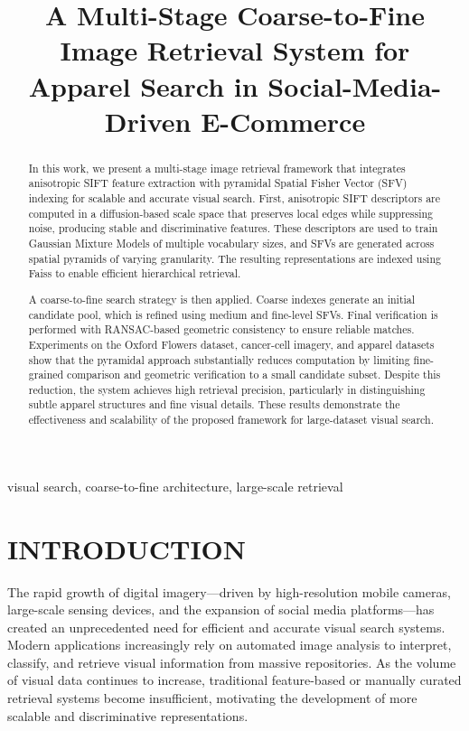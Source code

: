 \documentclass[conference]{IEEEtran}
\title{A Multi-Stage Coarse-to-Fine Image Retrieval System for Apparel Search in Social-Media-Driven E-Commerce}
\author{\IEEEauthorblockN{Patrick Fuentes Carpio}
\IEEEauthorblockA{\textit{Department of Computer Science} \\
\textit{University of Example}\\
City, Country \\
email@example.com}
}
\begin{document}
\maketitle

\begin{abstract}
In this work, we present a multi-stage image retrieval framework that integrates anisotropic SIFT feature extraction with pyramidal Spatial Fisher Vector (SFV) indexing for scalable and accurate visual search. First, anisotropic SIFT descriptors are computed in a diffusion-based scale space that preserves local edges while suppressing noise, producing stable and discriminative features. These descriptors are used to train Gaussian Mixture Models of multiple vocabulary sizes, and SFVs are generated across spatial pyramids of varying granularity. The resulting representations are indexed using Faiss to enable efficient hierarchical retrieval.

A coarse-to-fine search strategy is then applied. Coarse indexes generate an initial candidate pool, which is refined using medium and fine-level SFVs. Final verification is performed with RANSAC-based geometric consistency to ensure reliable matches. Experiments on the Oxford Flowers dataset, cancer-cell imagery, and apparel datasets show that the pyramidal approach substantially reduces computation by limiting fine-grained comparison and geometric verification to a small candidate subset. Despite this reduction, the system achieves high retrieval precision, particularly in distinguishing subtle apparel structures and fine visual details. These results demonstrate the effectiveness and scalability of the proposed framework for large-dataset visual search.
\end{abstract}

\begin{IEEEkeywords}
visual search, coarse-to-fine architecture, large-scale retrieval
\end{IEEEkeywords}


\section{INTRODUCTION}
The rapid growth of digital imagery—driven by high-resolution mobile cameras, large-scale sensing devices, and the expansion of social media platforms—has created an unprecedented need for efficient and accurate visual search systems. Modern applications increasingly rely on automated image analysis to interpret, classify, and retrieve visual information from massive repositories. As the volume of visual data continues to increase, traditional feature-based or manually curated retrieval systems become insufficient, motivating the development of more scalable and discriminative representations.
\end{document}
